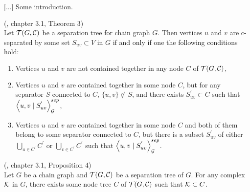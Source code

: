 %
%

[...] Some introduction.


\begin{thm} (\cite{CG}, chapter 3.1, Theorem 3) \\ 
	Let $\mathcal{T}(G, \mathcal{C})$ be a separation tree for chain graph $G$. Then vertices $u$ and $v$ are 
	c-separated by some set $S_{uv} \subset V$ in $G$ if and only if one the following conditions hold:
	
	\begin{enumerate}
		\item Vertices $u$ and $v$ are not contained together in any node $C$ of $\mathcal{T}(G, \mathcal{C})$,
		
		\item Vertices $u$ and $v$ are contained together in some node $C$, but for any separator $S$ connected
		to $C$, $\{u, v \} \not \subset S$, and there exists $S_{uv}^{'} \subset C$ such 
		that $\left\langle u , v \mid S_{uv}^{'} \right\rangle_{\mathcal{G}}^{sep}$,
		
		\item Vertices $u$ and $v$ are contained together in some node $C$ and both of them belong to some separator
		connected to $C$, but there is a subset $S_{uv}^{'}$ of either $\bigcup_{u \in C^{'}} C^{'}$ or
		$\bigcup_{v \in C^{'}} C^{'}$ such that $\left\langle u , v \mid S_{uv}^{'} \right\rangle_{\mathcal{G}}^{sep}$.
	\end{enumerate}
\end{thm}


 
\begin{prop} (\cite{CG}, chapter 3.1, Proposition 4) \\
	Let $G$ be a chain graph and $\mathcal{T}(G, \mathcal{C})$ be a separation tree of $G$. For any complex $\mathcal{K}$ in $G$, there
	exists some node tree $C$ of $\mathcal{T}(G, \mathcal{C})$ such that $\mathcal{K} \subset C$.
\end{prop}